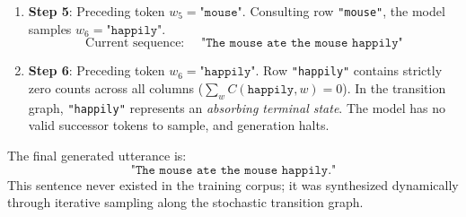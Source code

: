 \documentclass[../../../main.tex]{subfiles}
\begin{document}
\begin{enumerate}
    \item \textbf{Step 5}: Preceding token $w_5 = \texttt{"mouse"}$. Consulting row \texttt{"mouse"}, the model samples $w_6 = \texttt{"happily"}$.
    \begin{equation}
    \text{Current sequence: } \quad \texttt{"The mouse ate the mouse happily"}
    \end{equation}

    \item \textbf{Step 6}: Preceding token $w_6 = \texttt{"happily"}$. Row \texttt{"happily"} contains strictly zero counts across all columns ($\sum_w C(\texttt{happily}, w) = 0$). In the transition graph, \texttt{"happily"} represents an \textit{absorbing terminal state}. The model has no valid successor tokens to sample, and generation halts.
\end{enumerate}

The final generated utterance is:
\begin{equation}
\texttt{"The mouse ate the mouse happily."}
\end{equation}
This sentence never existed in the training corpus; it was synthesized dynamically through iterative sampling along the stochastic transition graph.
\end{document}
